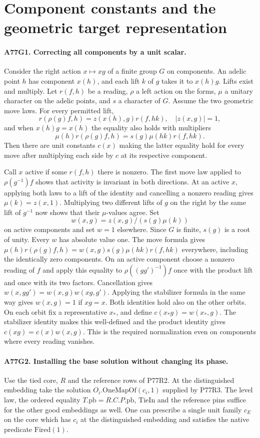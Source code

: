 \section{Component constants and the geometric target representation}

\paragraph{A77G1. Correcting all components by a unit scalar.}
Consider the right action $x\mapsto xg$ of a finite group $G$ on
components. An adelic point $h$ has component $x(h)$, and each
lift $k$ of $g$ takes it to $x(h)g$. Lifts exist and multiply.
Let $r(f,h)$ be a reading, $\rho$ a left action on the forms,
$\mu$ a unitary character on the adelic points, and $s$ a character
of $G$. Assume the two geometric move laws. For every permitted lift,
\[
 r(\rho(g)f,h)=z(x(h),g)r(f,hk),\quad |z(x,g)|=1 ,
\]
and when $x(h)g=x(h)$ the equality also holds with multipliers
\[
 \mu(h) r(\rho(g)f,h)=s(g)\mu(hk)r(f,hk).
\]
Then there are unit constants $c(x)$ making the latter equality
hold for every move after multiplying each side by $c$ at its
respective component.

Call $x$ active if some $r(f,h)$ there is nonzero. The first
move law applied to $\rho(g^{-1})f$ shows that activity is
invariant in both directions. At an active $x$, applying both
laws to a lift of the identity and cancelling a nonzero reading
gives $\mu(k)=z(x,1)$. Multiplying two different lifts of $g$
on the right by the same lift of $g^{-1}$ now shows that their
$\mu$-values agree. Set
\[
 w(x,g)=z(x,g)/(s(g)\mu(k))
\]
on active components and set $w=1$ elsewhere. Since $G$ is
finite, $s(g)$ is a root of unity. Every $w$ has absolute value
one. The move formula gives
$\mu(h)r(\rho(g)f,h)=w(x,g)s(g)\mu(hk)r(f,hk)$ everywhere,
including the identically zero components. On an active component
choose a nonzero reading of $f$ and apply this equality to
$\rho((gg')^{-1})f$ once with the product lift and once with its
two factors. Cancellation gives
$w(x,gg')=w(x,g)w(xg,g')$. Applying the stabilizer formula in
the same way gives $w(x,g)=1$ if $xg=x$. Both identities hold
also on the other orbits. On each orbit fix a representative $x_*$,
and define $c(x_*g)=w(x_*,g)$. The stabilizer identity makes this
well-defined and the product identity gives
$c(xg)=c(x)w(x,g)$. This is the required normalization even on
components where every reading vanishes.

\paragraph{A77G2. Installing the base solution without changing its phase.}
Use the tied core, $R$ and the reference rows of P77R2. At the
distinguished embedding take the solution
$O_i.\mathrm{OneMapOf}(c_i,1)$ supplied by P77R3.
The level law, the ordered equality $T.\mathrm{pb}=R.C.P.\mathrm{pb}$,
$\mathrm{TieIn}$ and the reference pins suffice for the other good
embeddings as well. One can prescribe a single
unit family $c_E$ on the core which has $c_i$ at the distinguished
embedding and satisfies the native predicate $\mathrm{Fired}(1)$.

